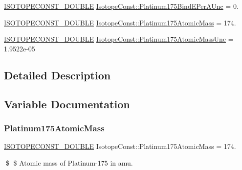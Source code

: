 \begin{DoxyCompactItemize}
\mbox{\hyperlink{group___isotope_const-_macros_ga8f45a7272ce02c0b4c65c44636ed719a}{I\+S\+O\+T\+O\+P\+E\+C\+O\+N\+S\+T\+\_\+\+D\+O\+U\+B\+LE}} \mbox{\hyperlink{group___isotope_const-_platinum-_pt175_ga34e01f2fdbb7e4c5b63f6dfd0cc37c13}{Isotope\+Const\+::\+Platinum175\+Bind\+E\+Per\+A\+Unc}} = 0.
\item 
\mbox{\hyperlink{group___isotope_const-_macros_ga8f45a7272ce02c0b4c65c44636ed719a}{I\+S\+O\+T\+O\+P\+E\+C\+O\+N\+S\+T\+\_\+\+D\+O\+U\+B\+LE}} \mbox{\hyperlink{group___isotope_const-_platinum-_pt175_ga033849bdf61e99e56057a46e31681e09}{Isotope\+Const\+::\+Platinum175\+Atomic\+Mass}} = 174.
\item 
\mbox{\hyperlink{group___isotope_const-_macros_ga8f45a7272ce02c0b4c65c44636ed719a}{I\+S\+O\+T\+O\+P\+E\+C\+O\+N\+S\+T\+\_\+\+D\+O\+U\+B\+LE}} \mbox{\hyperlink{group___isotope_const-_platinum-_pt175_ga8071356313b12f864585d8827e4dd726}{Isotope\+Const\+::\+Platinum175\+Atomic\+Mass\+Unc}} = 1.\+9522e-\/05
\end{DoxyCompactItemize}


\subsection{Detailed Description}


\subsection{Variable Documentation}
\mbox{\label{group___isotope_const-_platinum-_pt175_ga033849bdf61e99e56057a46e31681e09}} 
\subsubsection{\texorpdfstring{Platinum175\+Atomic\+Mass}{Platinum175AtomicMass}}
{\footnotesize\ttfamily \mbox{\hyperlink{group___isotope_const-_macros_ga8f45a7272ce02c0b4c65c44636ed719a}{I\+S\+O\+T\+O\+P\+E\+C\+O\+N\+S\+T\+\_\+\+D\+O\+U\+B\+LE}} Isotope\+Const\+::\+Platinum175\+Atomic\+Mass = 174.}

\$ \$ Atomic mass of Platinum-\/175 in amu. \mbox{\label{group___isotope_const-_platinum-_pt175_ga8071356313b12f864585d8827e4dd726}} 
